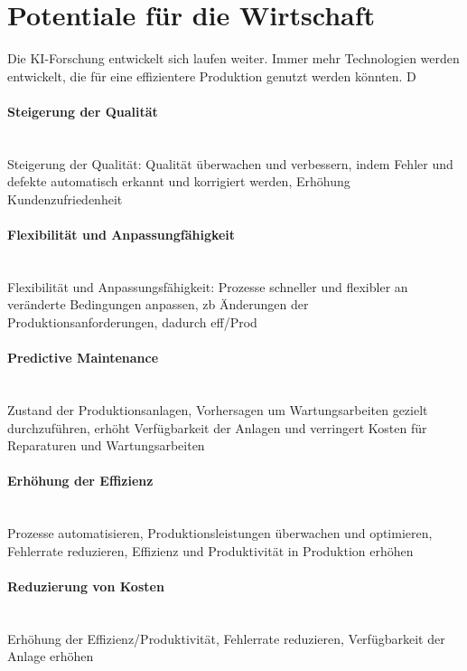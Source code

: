 \documentclass[a4paper,12pt, german]{report}
\begin{document}
\section{Potentiale für die Wirtschaft}

Die KI-Forschung entwickelt sich laufen weiter. Immer mehr Technologien werden entwickelt, die für eine effizientere Produktion genutzt werden könnten. D



\paragraph{Steigerung der Qualität} $ $ \\ 
Steigerung der Qualität: Qualität überwachen und verbessern, indem Fehler und defekte automatisch erkannt und korrigiert werden, Erhöhung Kundenzufriedenheit

\paragraph{Flexibilität und Anpassungfähigkeit} $ $ \\ 
Flexibilität und Anpassungsfähigkeit: Prozesse schneller und flexibler an veränderte Bedingungen anpassen, zb Änderungen der Produktionsanforderungen, dadurch eff/Prod

\paragraph{Predictive Maintenance} $ $ \\ 
Zustand der Produktionsanlagen, Vorhersagen um Wartungsarbeiten gezielt durchzuführen, erhöht Verfügbarkeit der Anlagen und verringert Kosten für Reparaturen und Wartungsarbeiten

\paragraph{Erhöhung der Effizienz} $ $ \\ 
Prozesse automatisieren, Produktionsleistungen überwachen und optimieren, Fehlerrate reduzieren, Effizienz und Produktivität in Produktion erhöhen

\paragraph{Reduzierung von Kosten} $ $ \\ 
Erhöhung der Effizienz/Produktivität, Fehlerrate reduzieren, Verfügbarkeit der Anlage erhöhen
\end{document}
